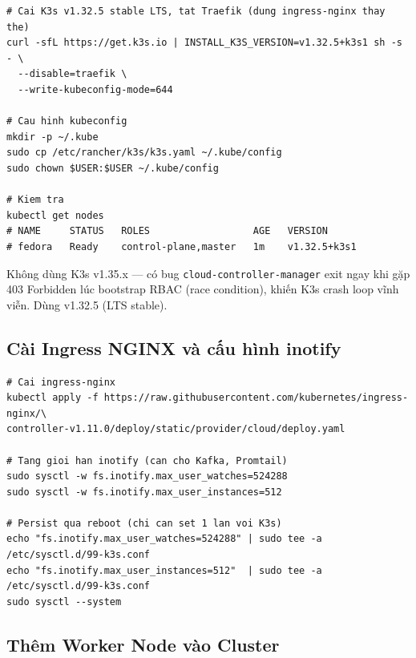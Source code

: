 \begin{lstlisting}[style=bashstyle, caption=Cài K3s v1.32.5 (disable Traefik)]
# Cai K3s v1.32.5 stable LTS, tat Traefik (dung ingress-nginx thay the)
curl -sfL https://get.k3s.io | INSTALL_K3S_VERSION=v1.32.5+k3s1 sh -s - \
  --disable=traefik \
  --write-kubeconfig-mode=644

# Cau hinh kubeconfig
mkdir -p ~/.kube
sudo cp /etc/rancher/k3s/k3s.yaml ~/.kube/config
sudo chown $USER:$USER ~/.kube/config

# Kiem tra
kubectl get nodes
# NAME     STATUS   ROLES                  AGE   VERSION
# fedora   Ready    control-plane,master   1m    v1.32.5+k3s1
\end{lstlisting}

\begin{warnbox}
	Không dùng K3s v1.35.x — có bug \texttt{cloud-controller-manager} exit ngay khi gặp 403 Forbidden
	lúc bootstrap RBAC (race condition), khiến K3s crash loop vĩnh viễn. Dùng v1.32.5 (LTS stable).
\end{warnbox}

\subsection{Cài Ingress NGINX và cấu hình inotify}

\begin{lstlisting}[style=bashstyle, caption=Cài ingress-nginx và tăng giới hạn inotify]
# Cai ingress-nginx
kubectl apply -f https://raw.githubusercontent.com/kubernetes/ingress-nginx/\
controller-v1.11.0/deploy/static/provider/cloud/deploy.yaml

# Tang gioi han inotify (can cho Kafka, Promtail)
sudo sysctl -w fs.inotify.max_user_watches=524288
sudo sysctl -w fs.inotify.max_user_instances=512

# Persist qua reboot (chi can set 1 lan voi K3s)
echo "fs.inotify.max_user_watches=524288" | sudo tee -a /etc/sysctl.d/99-k3s.conf
echo "fs.inotify.max_user_instances=512"  | sudo tee -a /etc/sysctl.d/99-k3s.conf
sudo sysctl --system
\end{lstlisting}

\subsection{Thêm Worker Node vào Cluster}


